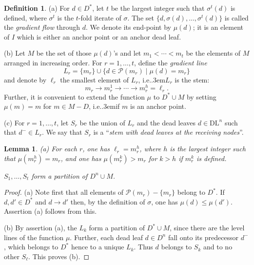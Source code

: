 \documentclass[12pt]{amsart}
\numberwithin{equation}{section}
\newtheorem{lem}[thm]{Lemma}
\theoremstyle{definition}
\newtheorem{defin}[thm]{Definition}
\def\ie{{i.e.}\kern.3em}
\def\DL{\mathrm{DL}}  %
\begin{document}
\begin{defin} (a) For $d\in D^*$, let $t$ be the largest integer such that $\sigma^t(d)$ is defined, 
where $\sigma^t$ is the $t$-fold iterate of $\sigma$. 
The set $\{d,\sigma(d),\dots, \sigma^t(d)\}$ is called the \emph{gradient flow} through $d$. We denote its 
end-point by $\mu(d)$; it is an element of $I$ which is either an anchor point or an anchor dead leaf. 


\smallskip 
(b) Let $M$ be the set of those $\mu(d)$'s and let $m_1 < \cdots < m_t$ be the elements of $M$ arranged in increasing order. 
For $r = 1,\dots, t$,  define the \emph{gradient line} 
\begin{equation}
L_r = \{m_r\} \cup \{d \in \mathcal{P}(m_r) \mid \mu(d) = m_r\} 
\end{equation}
and denote by $\ell_r$ the smallest element of $L_r$, \ie $L_r$ is the stem: 
\begin{equation}\label{Lr-stem} 
m_r \to m_r^1 \to \cdots \to m_r^h = \ell_r. 
\end{equation}
Further, it is convenient to extend the function $\mu$ to $D^* \cup M$ by setting $\mu(m) = m$ for $m \in M - D$, 
\ie if $m$ is an anchor point.  

\smallskip (c) For $r = 1,\dots, t$, let $S_r$ be the union of $L_r$ and the dead leaves $d\in \DL^n$ such that 
$d^- \in L_r$. We say that $S_r$ is a ``\emph{stem with dead leaves at the receiving nodes}''. 
\end{defin} 

\begin{lem}\label{lem-stems} 
{\rm (a)} For each $r$, one has $\ell_r = m_r^h$, where $h$ is the largest integer such that
 $\mu(m_r^h) = m_r$, and one has $\mu(m_r^k) > m_r$ for $k > h$ if $m_r^k$ is defined. 

  $S_1,\dots, S_t$ form a partition of $D^n \cup M$.
\end{lem} 

\begin{proof} (a) Note first that all elements of $\mathcal{P}(m_r) - \{m_r\}$ belong to $D^*$. If $d,d'\in D^*$ 
and $d\to d'$ then, by the definition of $\sigma$, one has $\mu(d)\leq \mu(d')$. Assertion (a) follows from this. 

\smallskip (b) By assertion (a), the $L_k$ form a partition of $D^* \cup M$, since there are the level lines of the function $\mu$. Further, each dead leaf $d \in D^n$ fall onto its predecessor $d^-$, which belongs to $D^*$ 
hence to a unique $L_k$. Thus $d$ belongs to $S_k$ and to no other $S_\ell$. This proves (b). 
\end{proof} 
\end{document}
